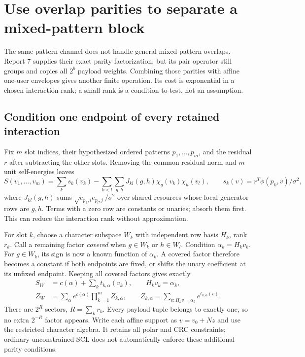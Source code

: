 \documentclass[10pt,a4paper]{article}
\begin{document}
\section{Use overlap parities to separate a mixed-pattern block}
\label{sec:parity-cover}
The same-pattern channel does not handle general mixed-pattern overlaps. Report 7 supplies their
exact parity factorization, but its pair operator still groups and copies all $2^b$ payload weights.
Combining those parities with affine one-user envelopes gives another finite operation. Its cost is
exponential in a chosen interaction rank; a small rank is a condition to test, not an assumption.

\subsection{Condition one endpoint of every retained interaction}
Fix $m$ slot indices, their hypothesized ordered patterns $p_1,\ldots,p_m$, and the residual $r$ after
subtracting the other slots. Removing the common residual norm and $m$ unit self-energies leaves
\begin{equation}
 S(v_1,\ldots,v_m)=\sum_k s_k(v_k)
 -\sum_{k<l}\sum_{g,h}J_{kl}(g,h)\chi_g(v_k)\chi_h(v_l),\qquad
 s_k(v)=r^T\phi(p_k,v)/\sigma^2,
 \label{eq:cover-score}
\end{equation}
where $J_{kl}(g,h)$ sums $\sqrt{e_{p_k,i}e_{p_l,j}}/\sigma^2$ over shared resources whose local
generator rows are $g,h$. Terms with a zero row are constants or unaries; absorb them first.
This can reduce the interaction rank without approximation.

For slot $k$, choose a character subspace $W_k$ with independent row basis $H_k$, rank $r_k$.
Call a remaining factor \emph{covered} when $g\in W_k$ or $h\in W_l$. Condition
$\alpha_k=H_kv_k$. For $g\in W_k$, its sign is now a known function of $\alpha_k$.
A covered factor therefore becomes a constant if both endpoints are fixed, or shifts the unary
coefficient at its unfixed endpoint. Keeping all covered factors gives exactly
\begin{align}
 S_W&=c(\alpha)+\sum_k t_{k,\alpha}(v_k),\qquad H_kv_k=\alpha_k,\nonumber\\
 Z_W&=\sum_\alpha e^{c(\alpha)}\prod_{k=1}^m Z_{k,\alpha},\qquad
 Z_{k,\alpha}=\sum_{v:H_kv=\alpha_k}e^{t_{k,\alpha}(v)}.
 \label{eq:cover-partition}
\end{align}
There are $2^R$ sectors, $R=\sum_kr_k$. Every payload tuple belongs to exactly one, so no extra
$2^{-R}$ factor appears. Write each affine support as $v=v_0+Nz$ and use the restricted character
algebra. It retains all polar and CRC constraints; ordinary unconstrained SCL does not automatically
enforce these additional parity conditions.
\end{document}
